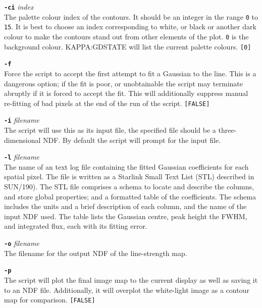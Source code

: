 \documentclass[twoside,11pt]{article}
\newcommand{\xref}[3]{#1}
\renewcommand{\_}{\texttt{\symbol{95}}}
\newcommand{\sstitem}{\item}
\begin{document}
{{{         \sstitem
         {\bf{\tt{-ci}}} {\em index}\\
           The palette colour index of the contours.  It should be an
           integer in the range {\tt 0} to {\tt 15}.  It is best to choose
           an index corresponding to white, or black or another dark colour
           to make the contours stand out from other elements of the plot.
           {\tt 0} is the background colour. \xref{KAPPA:GDSTATE}{sun95}{GDSTATE}
           will list the current palette colours.  {\tt [0]}

         \sstitem
         {\bf{\tt{-f}}}\\
           Force the script to accept the first attempt to fit a Gaussian to
           the line.  This is a dangerous option; if the fit is poor, or
           unobtainable the script may terminate abruptly if it is forced to
           accept the fit.  This will additionally suppress manual re-fitting
           of bad pixels at the end of the run of the script.  {\tt [FALSE]}

         \sstitem
         {\bf{\tt{-i}}} {\em filename}\\
           The script will use this as its input file, the specified file should
           be a three-dimensional NDF.  By default the script will prompt for the
           input file.

         \sstitem
         {\bf{\tt{-l}}} {\em filename}\\
           The name of an text log file containing the fitted Gaussian
           coefficients for each spatial pixel.  The file is written as a
           Starlink Small Text List (STL) described in
           \xref{SUN/190}{sun190}{}).  The STL file comprises a schema to
           locate and describe the columns, and store global properties; and a
           formatted table of the coefficients.  The schema includes the units
           and a brief description of each column, and the name of the input
           NDF used.  The table lists the Gaussian centre, peak height the FWHM,
           and integrated flux, each with its fitting error.

         \sstitem
         {\bf{\tt{-o}}} {\em filename}\\
           The filename for the output NDF of the line-strength map.

         \sstitem
         {\bf{\tt{-p}}}\\
           The script will plot the final image map to the current display
           as well as saving it to an NDF file.  Additionally, it will overplot
           the white-light image as a contour map for comparison. {\tt [FALSE]}

}}}
\end{document}
